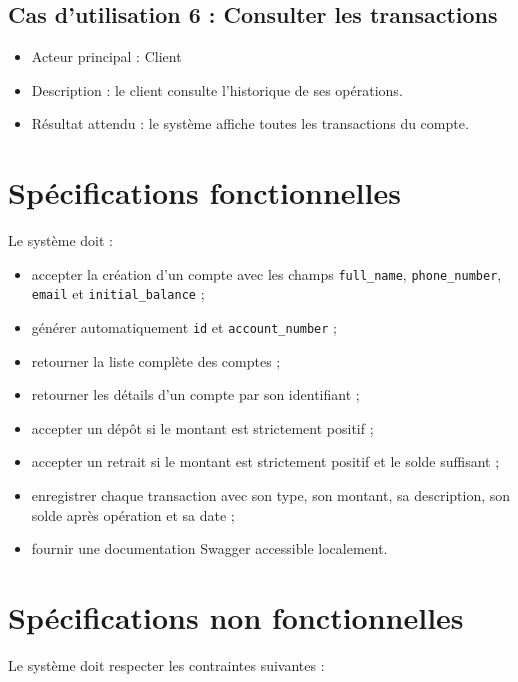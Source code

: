 \documentclass[12pt,a4paper]{article}
\begin{document}
\subsection{Cas d'utilisation 6 : Consulter les transactions}

\begin{itemize}
    \item Acteur principal : Client
    \item Description : le client consulte l'historique de ses opérations.
    \item Résultat attendu : le système affiche toutes les transactions du compte.
\end{itemize}

\section{Spécifications fonctionnelles}

Le système doit :

\begin{itemize}
    \item accepter la création d'un compte avec les champs \texttt{full\_name}, \texttt{phone\_number}, \texttt{email} et \texttt{initial\_balance} ;
    \item générer automatiquement \texttt{id} et \texttt{account\_number} ;
    \item retourner la liste complète des comptes ;
    \item retourner les détails d'un compte par son identifiant ;
    \item accepter un dépôt si le montant est strictement positif ;
    \item accepter un retrait si le montant est strictement positif et le solde suffisant ;
    \item enregistrer chaque transaction avec son type, son montant, sa description, son solde après opération et sa date ;
    \item fournir une documentation Swagger accessible localement.
\end{itemize}

\section{Spécifications non fonctionnelles}

Le système doit respecter les contraintes suivantes :
\end{document}

